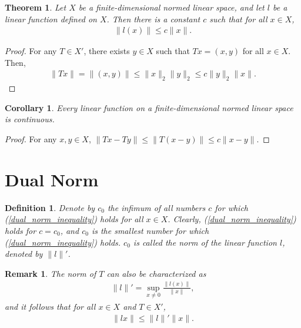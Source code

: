 \documentclass[11pt]{book}
\newtheorem{definition}{Definition}[section]
\newtheorem{theorem}{Theorem}[section]
\newtheorem{corollary}{Corollary}[theorem]
\newtheorem{remark}{Remark}[section]
\theoremstyle{definition}
\numberwithin{equation}{chapter}
\begin{document}
\medskip

\begin{theorem}
Let $X$ be a finite-dimensional normed linear space, and let $l$ be a linear function defined on $X$. Then there is a constant $c$ such that for all $x \in X$,
\begin{align}\label{dual_norm_inequality}
    \|l(x)\| \leq c \|x\|.
\end{align}
\end{theorem}
\begin{proof}
For any $T \in X'$, there exists $y \in X$ such that $Tx = (x, y)$ for all $x \in X$. Then,
\begin{align*}
    \|Tx\| = \|(x,y)\| \leq \|x\|_2 \|y\|_2 \leq c \|y\|_2 \|x\|.
\end{align*}
\end{proof}

\medskip

\begin{corollary}\label{linear_function_continuous}
Every linear function on a finite-dimensional normed linear space is continuous.
\end{corollary}
\begin{proof}
For any $x, y \in X$, $\|Tx - Ty\| \leq \|T(x - y)\| \leq c \|x - y\|$.
\end{proof}

\medskip

\section{Dual Norm}

\begin{definition}
Denote by $c_0$ the infimum of all numbers $c$ for which (\ref{dual_norm_inequality}) holds for all $x \in X$. Clearly, (\ref{dual_norm_inequality}) holds for $c = c_0$, and $c_0$ is the smallest number for which (\ref{dual_norm_inequality}) holds. $c_0$ is called the norm of the linear function $l$, denoted by $\|l\|'$.
\end{definition}

\begin{remark}
The norm of $T$ can also be characterized as
\begin{align}\label{linear_function_norm}
    \|l\|' = \sup_{x \neq 0} \frac{\|l(x)\|}{\|x\|},
\end{align}
and it follows that for all $x \in X$ and $T \in X'$,
\begin{align}\label{equ_14_5}
    \|lx\| \leq \|l\|' \|x\|.
\end{align}
\end{remark}
\end{document}
